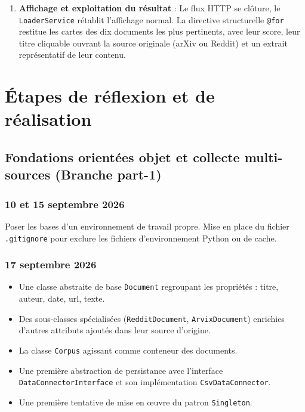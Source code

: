 \documentclass[12pt,a4paper]{article}
\begin{document}
\begin{enumerate}
    \item \textbf{Affichage et exploitation du résultat} :
        Le flux HTTP se clôture, le \texttt{LoaderService} rétablit l'affichage normal. La directive structurelle \texttt{@for} restitue les cartes des dix documents les plus pertinents, avec leur score, leur titre cliquable ouvrant la source originale (arXiv ou Reddit) et un extrait représentatif de leur contenu.
\end{enumerate}

\newpage

\section{Étapes de réflexion et de réalisation}

\subsection{Fondations orientées objet et collecte multi-sources (Branche part-1)}

\subsubsection{10 et 15 septembre 2026}
Poser les bases d'un environnement de travail propre. Mise en place du fichier \texttt{.gitignore} pour exclure les fichiers d'environnement Python ou de cache.

\subsubsection{17 septembre 2026}
\begin{itemize}
    \item Une classe abstraite de base \texttt{Document} regroupant les propriétés : titre, auteur, date, url, texte.
    \item Des sous-classes spécialisées (\texttt{RedditDocument}, \texttt{ArvixDocument}) enrichies d'autres attributs ajoutés dans leur source d'origine.
    \item La classe \texttt{Corpus} agissant comme conteneur des documents.
    \item Une première abstraction de persistance avec l'interface \texttt{DataConnectorInterface} et son implémentation \texttt{CsvDataConnector}.
    \item Une première tentative de mise en œuvre du patron \texttt{Singleton}.
\end{itemize}
\end{document}
